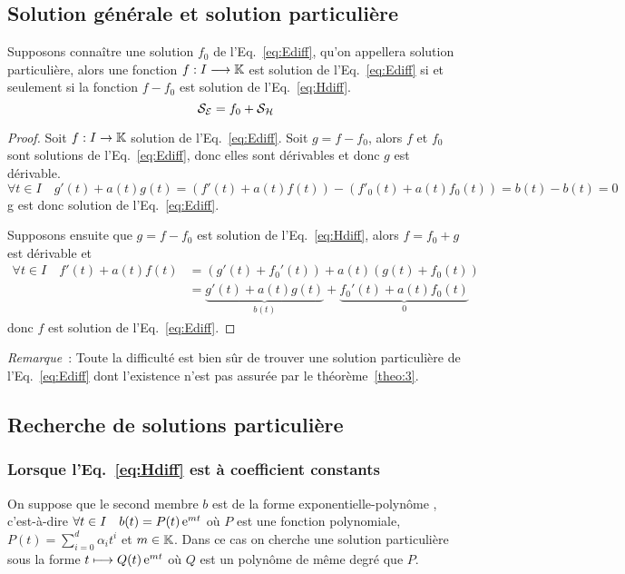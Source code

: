 \subsection{Solution générale et solution particulière}
\label{subsec:solutiongeneraleetpart}
\begin{theo}\label{theo:3}
Supposons connaître une solution $f_0$ de l'Eq.~\eqref{eq:Ediff}, qu'on appellera solution particulière, alors une fonction $f:I \longrightarrow \mathbb{K}$ est solution de l'Eq.~\eqref{eq:Ediff} si et seulement si la fonction $f-f_0$ est solution de l'Eq.~\eqref{eq:Hdiff}.
\begin{equation}
\mathcal{S}_{\mathcal{E}}=f_0 + \mathcal{S}_{\mathcal{H}}
\end{equation}
\end{theo}
\begin{proof}
  Soit $f:I \rightarrow \mathbb{K}$ solution de l'Eq.~\eqref{eq:Ediff}. Soit $g=f-f_0$, alors $f$ et $f_0$ sont solutions de l'Eq.~\eqref{eq:Ediff}, donc elles sont dérivables et donc $g$ est dérivable.
  \begin{equation}
    \forall t \in I \quad g'(t)+a(t)g(t)=(f'(t)+a(t)f(t))-(f'_0(t)+a(t)f_0(t))=b(t)-b(t)=0
  \end{equation}
g est donc solution de l'Eq.~\eqref{eq:Ediff}.

Supposons ensuite que $g=f-f_0$ est solution de l'Eq.~\eqref{eq:Hdiff}, alors $f=f_0+g$ est dérivable et
\begin{align}
  \forall t \in I \quad f'(t)+a(t)f(t)&=(g'(t)+f_0'(t)) + a(t)(g(t)+f_0(t)) \\ &=\underbrace{g'(t)+a(t)g(t)}_{b(t)} + \underbrace{f_0'(t)+a(t)f_0(t)}_{0}
\end{align}
donc $f$ est solution de l'Eq.~\eqref{eq:Ediff}.
\end{proof}

\emph{Remarque}~: Toute la difficulté est bien sûr de trouver une solution particulière de l'Eq.~\eqref{eq:Ediff} dont l'existence n'est pas assurée par le théorème~\ref{theo:3}.

\subsection{Recherche de solutions particulière}
\label{subsec:recherchesolutionpart}
\subsubsection{Lorsque l'Eq.~\eqref{eq:Hdiff} est à coefficient constants}
\label{subsubsec:recherchesolutionpart-coefconstants}
On suppose que le second membre $b$ est de la forme \og exponentielle-polynôme \fg{}, c'est-à-dire $\forall t \in I \quad b(t)=P(t) \operatorname{e}^{mt}$ où $P$ est une fonction polynomiale, $P(t)=\sum_{i=0}^d \alpha_i t^i$ et $m \in \mathbb{K}$. Dans ce cas on cherche une solution particulière sous la forme $t \longmapsto Q(t)\operatorname{e}^{mt}$ où $Q$ est un polynôme de même degré que $P$.

